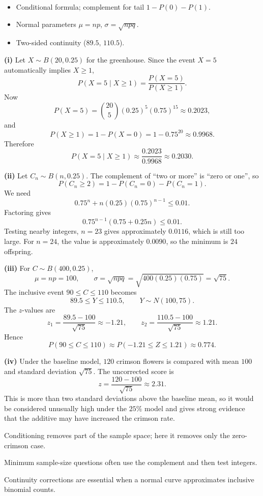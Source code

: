 \begin{hint}
\begin{itemize}[leftmargin=*]
\item Conditional formula; complement for tail $1-P(0)-P(1)$.
\item Normal parameters $\mu=np$, $\sigma=\sqrt{npq}$.
\item Two-sided continuity ($89{.}5,\,110{.}5$).
\end{itemize}
\end{hint}

\begin{solution}
\textbf{(i)} Let $X\sim B(20,0{.}25)$ for the greenhouse. Since the event $X=5$ automatically implies $X\ge1$,
\[
P(X=5\mid X\ge1)=\frac{P(X=5)}{P(X\ge1)}.
\]
Now
\[
P(X=5)=\binom{20}{5}(0{.}25)^5(0{.}75)^{15}\approx0{.}2023,
\]
and
\[
P(X\ge1)=1-P(X=0)=1-0{.}75^{20}\approx0{.}9968.
\]
Therefore
\[
P(X=5\mid X\ge1)\approx\frac{0{.}2023}{0{.}9968}\approx \boxed{0{.}2030}.
\]

\textbf{(ii)} Let $C_n\sim B(n,0{.}25)$. The complement of ``two or more'' is ``zero or one'', so
\[
P(C_n\ge2)=1-P(C_n=0)-P(C_n=1).
\]
We need
\[
0{.}75^n+n(0{.}25)(0{.}75)^{n-1}\le0{.}01.
\]
Factoring gives
\[
0{.}75^{n-1}(0{.}75+0{.}25n)\le0{.}01.
\]
Testing nearby integers, $n=23$ gives approximately $0{.}0116$, which is still too large. For $n=24$, the value is approximately $0{.}0090$, so the minimum is $\boxed{24}$ offspring.

\textbf{(iii)} For $C\sim B(400,0{.}25)$,
\[
\mu=np=100,\qquad \sigma=\sqrt{npq}=\sqrt{400(0{.}25)(0{.}75)}=\sqrt{75}.
\]
The inclusive event $90\le C\le110$ becomes
\[
89{.}5\le Y\le110{.}5,\qquad Y\sim N(100,75).
\]
The $z$-values are
\[
z_1=\frac{89{.}5-100}{\sqrt{75}}\approx-1{.}21,\qquad
z_2=\frac{110{.}5-100}{\sqrt{75}}\approx1{.}21.
\]
Hence
\[
P(90\le C\le110)\approx P(-1{.}21\le Z\le1{.}21)\approx \boxed{0{.}774}.
\]

\textbf{(iv)} Under the baseline model, $120$ crimson flowers is compared with mean $100$ and standard deviation $\sqrt{75}$. The uncorrected score is
\[
z=\frac{120-100}{\sqrt{75}}\approx \boxed{2{.}31}.
\]
This is more than two standard deviations above the baseline mean, so it would be considered unusually high under the $25\%$ model and gives strong evidence that the additive may have increased the crimson rate.
\end{solution}

\begin{takeaways}
\item Conditioning removes part of the sample space; here it removes only the zero-crimson case.
\item Minimum sample-size questions often use the complement and then test integers.
\item Continuity corrections are essential when a normal curve approximates inclusive binomial counts.
\end{takeaways}

